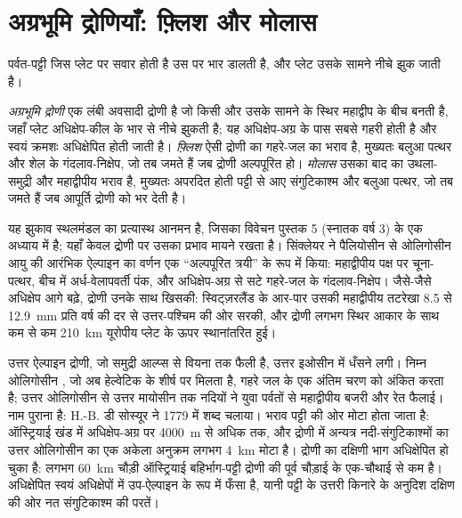 \section{अग्रभूमि द्रोणियाँ: फ़्लिश और मोलास}\label{sec:b2:alpine-orogen:foreland}

पर्वत-पट्टी जिस प्लेट पर सवार होती है उस पर भार डालती है, और प्लेट उसके सामने नीचे झुक जाती है।

\begin{definition}[अग्रभूमि द्रोणी; फ़्लिश; मोलास]\label{def:b2:alpine-orogen:foreland}
\emph{अग्रभूमि द्रोणी} एक लंबी अवसादी द्रोणी है जो
किसी  और उसके सामने के स्थिर महाद्वीप के बीच बनती है, जहाँ प्लेट
अधिक्षेप-कील के भार से नीचे झुकती है; यह अधिक्षेप-अग्र के पास सबसे गहरी होती है और स्वयं
क्रमशः अधिक्षेपित होती जाती है। \emph{फ़्लिश} ऐसी द्रोणी का गहरे-जल का भराव है,
मुख्यतः बलुआ पत्थर और शेल के गंदलाव-निक्षेप, जो तब जमते हैं जब द्रोणी अल्पपूरित हो।
\emph{मोलास} उसका बाद का उथला-समुद्री और महाद्वीपीय भराव है, मुख्यतः
अपरदित होती पट्टी से आए संगुटिकाश्म और बलुआ पत्थर, जो तब जमते हैं जब आपूर्ति
द्रोणी को भर देती है।
\end{definition}

यह झुकाव स्थलमंडल का प्रत्यास्थ आनमन है, जिसका विवेचन पुस्तक 5 (स्नातक वर्ष 3) के एक
अध्याय में है; यहाँ केवल द्रोणी पर उसका प्रभाव मायने रखता है। सिंक्लेयर ने पैलियोसीन से ओलिगोसीन आयु की आरंभिक ऐल्पाइन  का वर्णन
एक ``अल्पपूरित त्रयी'' के रूप में किया: महाद्वीपीय पक्ष पर चूना-पत्थर, बीच में अर्ध-वेलापवर्ती पंक,
और अधिक्षेप-अग्र से सटे गहरे-जल के गंदलाव-निक्षेप। जैसे-जैसे अधिक्षेप आगे बढ़े, द्रोणी
उनके साथ खिसकी: स्विट्ज़रलैंड के आर-पार उसकी महाद्वीपीय तटरेखा 8.5
से \qty{12.9}{mm} प्रति वर्ष की दर से उत्तर-पश्चिम की ओर सरकी, और द्रोणी लगभग स्थिर आकार के साथ कम से कम
\qty{210}{km} यूरोपीय प्लेट के ऊपर स्थानांतरित हुई।

उत्तर ऐल्पाइन  द्रोणी, जो समुद्री आल्प्स से वियना तक फैली है, उत्तर इओसीन में
धँसने लगी। निम्न ओलिगोसीन , जो अब हेल्वेटिक  के शीर्ष पर मिलता है,
गहरे जल के एक अंतिम चरण को अंकित करता है; उत्तर ओलिगोसीन से उत्तर मायोसीन तक नदियों ने
युवा पर्वतों से महाद्वीपीय बजरी और रेत फैलाई। नाम पुराना है: H.-B. डी सोस्यूर ने
1779 में \emph{} शब्द चलाया। भराव पट्टी की ओर मोटा होता जाता है:
ऑस्ट्रियाई खंड में अधिक्षेप-अग्र पर \qty{4000}{m} से अधिक तक, और द्रोणी में अन्यत्र
नदी-संगुटिकाश्मों का उत्तर ओलिगोसीन का एक अकेला अनुक्रम लगभग \qty{4}{km} मोटा है। द्रोणी का
दक्षिणी भाग अधिक्षेपित हो चुका है: लगभग \qty{60}{km} चौड़ी ऑस्ट्रियाई बहिर्भाग-पट्टी द्रोणी की पूर्व चौड़ाई के
एक-चौथाई से कम है। अधिक्षेपित  स्वयं अधिक्षेपों में
उप-ऐल्पाइन  के रूप में फँसा है, यानी पट्टी के उत्तरी किनारे के अनुदिश दक्षिण की ओर नत
संगुटिकाश्म की परतें।

